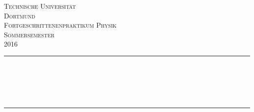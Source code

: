 \begin{titlepage}

\begin{center}

\vspace*{2cm}

\textsc{\LARGE Technische Universität\\ Dortmund}\\[1.5cm]

\textsc{\Large Fortgeschrittenenpraktikum Physik\\ Sommersemester \\ 2016}\\[0.5cm]


\newcommand{\HRule}{\rule{\linewidth}{0.5mm}}
\HRule \\[0.4cm]
{ \huge \bfseries \ENo }\\[0.4cm]
{ \huge \bfseries \EN }\\[0.4cm]
{\large \bfseries \ED }\\[0.4cm]
{\Large \textsc{\Version}}
\HRule \\[1.5cm]

\begin{minipage}{0.4\textwidth}
\begin{flushleft} \large
\Names
\end{flushleft}
\end{minipage}
\hfill
\begin{minipage}{0.5\textwidth}
\begin{flushright} \large
\Emails
\end{flushright}
\end{minipage}

\vfill



\end{center}

\end{titlepage}